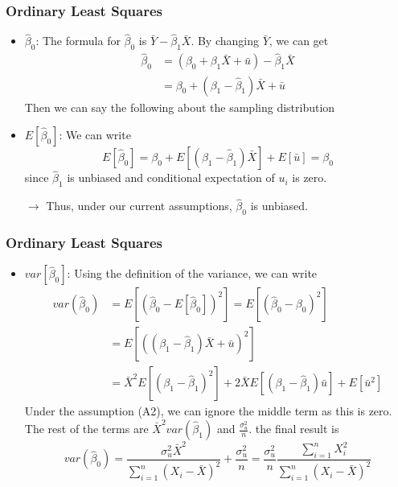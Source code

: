 \documentclass[compress]{beamer}
\begin{document}
\begin{frame}
\frametitle{Ordinary Least Squares}
\begin{itemize}
\item $\hat{\beta}_0$: The formula for $\hat{\beta}_0$ is $\bar{Y}-\hat{\beta}_1\bar{X}$. By changing $\bar{Y}$, we can get
\[
\begin{aligned}
\hat{\beta}_0&=(\beta_0+\beta_1\bar{X}+\bar{u})-\hat{\beta}_1\bar{X}\\
&=\beta_0+(\beta_1-\hat{\beta}_1)\bar{X}+\bar{u}
\end{aligned}
\]
Then we can say the following about the sampling distribution
\item $E[\hat{\beta}_0]$: We can write
\[
E[\hat{\beta}_0]=\beta_0+E[(\beta_1-\hat{\beta}_1)\bar{X}]+E[\bar{u}]=\beta_0
\]
since $\hat{\beta}_1$ is unbiased and conditional expectation of $u_i$ is zero. 
\item[$\to$]Thus, under our current assumptions, $\hat{\beta}_0$ is unbiased. 
\end{itemize}
\end{frame}

\begin{frame}
\frametitle{Ordinary Least Squares}
\begin{itemize}
\item $var[\hat{\beta}_0]$: Using the definition of the variance, we can write \[
\begin{aligned}
var(\hat{\beta}_0)&=E\left[\left(\hat{\beta}_0-E[\hat{\beta}_0]\right)^2\right] =E\left[\left(\hat{\beta}_0-{\beta}_0\right)^2\right]\\
&=E\left[\left( (\beta_1-\hat{\beta}_1)\bar{X}+\bar{u}\right)^2\right]\\
&=\bar{X}^2E\left[\left(\beta_1-\hat{\beta}_1 \right)^2\right]+ 2\bar{X}E\left[\left(\beta_1-\hat{\beta}_1 \right)\bar{u}\right] + E[\bar{u}^2]
\end{aligned}
\]
Under the assumption (A2), we can ignore the middle term as this is zero. The rest of the terms are $\bar{X}^2 var(\hat{\beta}_1)$ and $\frac{\sigma_u^2}{n}$. the final result is
\[
var(\hat{\beta}_0)=\frac{\sigma_u^2\bar{X}^2}{\sum_{i=1}^n(X_i-\bar{X})^2}+\frac{\sigma_u^2}{n}= \frac{\sigma_u^2}{n}\frac{\sum_{i=1}^nX_i^2}{\sum_{i=1}^n(X_i-\bar{X})^2}
\]
\end{itemize}
\end{frame}
\end{document}
